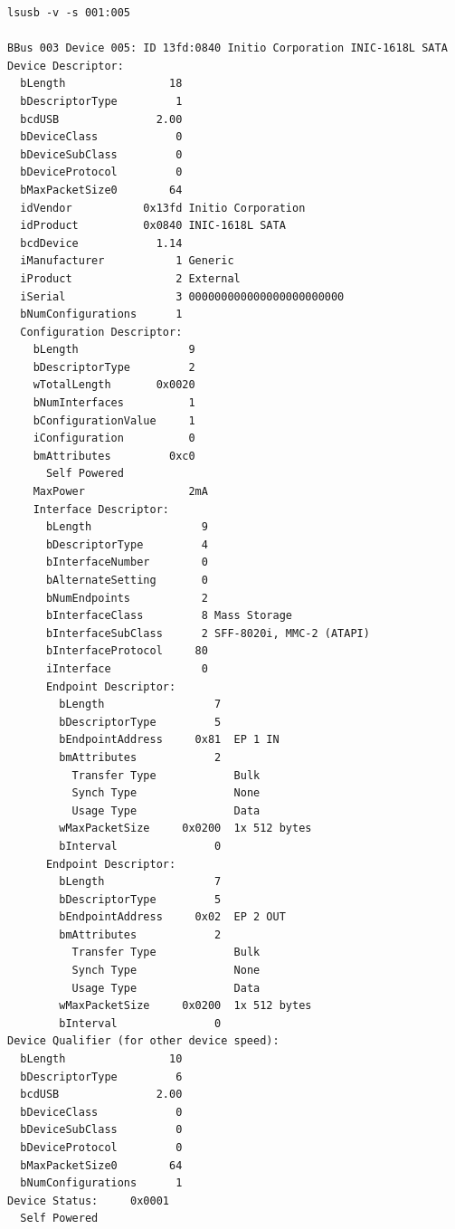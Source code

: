 \documentclass[mscthesis]{usiinfthesis}
\begin{document}
\begin{lstlisting}[language={},breaklines=true,postbreak=\mbox{\textcolor{red}{$\hookrightarrow$}\space}]
lsusb -v -s 001:005

BBus 003 Device 005: ID 13fd:0840 Initio Corporation INIC-1618L SATA
Device Descriptor:
  bLength                18
  bDescriptorType         1
  bcdUSB               2.00
  bDeviceClass            0 
  bDeviceSubClass         0 
  bDeviceProtocol         0 
  bMaxPacketSize0        64
  idVendor           0x13fd Initio Corporation
  idProduct          0x0840 INIC-1618L SATA
  bcdDevice            1.14
  iManufacturer           1 Generic
  iProduct                2 External
  iSerial                 3 000000000000000000000000
  bNumConfigurations      1
  Configuration Descriptor:
    bLength                 9
    bDescriptorType         2
    wTotalLength       0x0020
    bNumInterfaces          1
    bConfigurationValue     1
    iConfiguration          0 
    bmAttributes         0xc0
      Self Powered
    MaxPower                2mA
    Interface Descriptor:
      bLength                 9
      bDescriptorType         4
      bInterfaceNumber        0
      bAlternateSetting       0
      bNumEndpoints           2
      bInterfaceClass         8 Mass Storage
      bInterfaceSubClass      2 SFF-8020i, MMC-2 (ATAPI)
      bInterfaceProtocol     80 
      iInterface              0 
      Endpoint Descriptor:
        bLength                 7
        bDescriptorType         5
        bEndpointAddress     0x81  EP 1 IN
        bmAttributes            2
          Transfer Type            Bulk
          Synch Type               None
          Usage Type               Data
        wMaxPacketSize     0x0200  1x 512 bytes
        bInterval               0
      Endpoint Descriptor:
        bLength                 7
        bDescriptorType         5
        bEndpointAddress     0x02  EP 2 OUT
        bmAttributes            2
          Transfer Type            Bulk
          Synch Type               None
          Usage Type               Data
        wMaxPacketSize     0x0200  1x 512 bytes
        bInterval               0
Device Qualifier (for other device speed):
  bLength                10
  bDescriptorType         6
  bcdUSB               2.00
  bDeviceClass            0 
  bDeviceSubClass         0 
  bDeviceProtocol         0 
  bMaxPacketSize0        64
  bNumConfigurations      1
Device Status:     0x0001
  Self Powered

\end{lstlisting}
\end{document}
